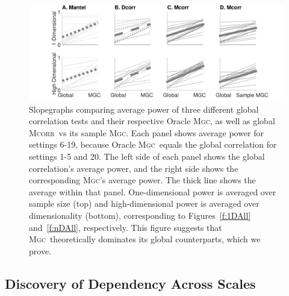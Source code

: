 \documentclass[11pt]{article}
\providecommand{\sct}[1]{{\normalfont\textsc{#1}}}
\newcommand{\Mgc}{\sct{Mgc}}
\newcommand{\Mgcp}{\sct{Mgc$_P$}}
\newcommand{\Hhg}{\sct{Hhg}}
\newcommand{\Dcorr}{\sct{Dcorr}}
\newcommand{\Mcorr}{\sct{Mcorr}}
\newcommand{\Mantel}{\sct{Mantel}}
\begin{document}
\begin{figure}
  \centering
  \includegraphics[width=1.0\textwidth]{Figures/FigSlope}
  \caption{
Slopegraphs comparing average power of three different global correlation tests and their respective Oracle \Mgc, as well as global \Mcorr~vs its sample \Mgc.  Each panel shows average power for settings 6-19, because Oracle \Mgc~equals the global correlation for settings 1-5 and  20. 
%
%
%
The left side of each panel shows the global correlation's average power, and 
the right side shows the corresponding \Mgc's average power. The thick line shows the average within that panel. 
One-dimensional power is averaged over sample size (top)  and high-dimensional power is averaged over dimensionality (bottom), corresponding to Figures~\ref{f:1DAll} and~\ref{f:nDAll}, respectively.
This figure suggests that \Mgc~theoretically dominates its global counterparts, which we prove. 
}
\label{f:pp}
\end{figure}






\subsection*{Discovery of Dependency Across Scales}
\label{main3}
\end{document}
